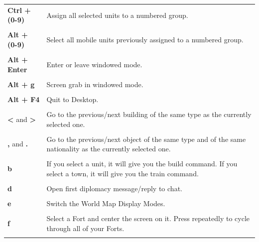 \begin{longtable}{p{1in} p{3in}}
    \textbf{Ctrl + (0-9)} & Assign all selected units to a numbered group.\\ \\
    \textbf{Alt + (0-9)} & Select all mobile units previously assigned to a numbered group.\\ \\
    \textbf{Alt + Enter} & Enter or leave windowed mode.\\ \\
    \textbf{Alt + g} & Screen grab in windowed mode.\\ \\
%
    \textbf{Alt + F4} & Quit to Desktop.\\ \\

    \textbf{<} and \textbf{>} & Go to the previous/next building of the same
    type as the currently selected one.\\ \\

    \textbf{,} and \textbf{.} & Go to the previous/next object of the same type
    and of the same nationality as the currently selected one.\\ \\
%
    \textbf{b} & If you select a unit, it will give you the build command. If you select a town, it will give you the train command.\\ \\
    \textbf{d} & Open first diplomacy message/reply to chat.\\ \\
    \textbf{e} & Switch the World Map Display Modes.\\ \\
    \textbf{f} & Select a Fort and center the screen on it. Press repeatedly to cycle through all of your Forts. \\ \\

        

\end{longtable}
